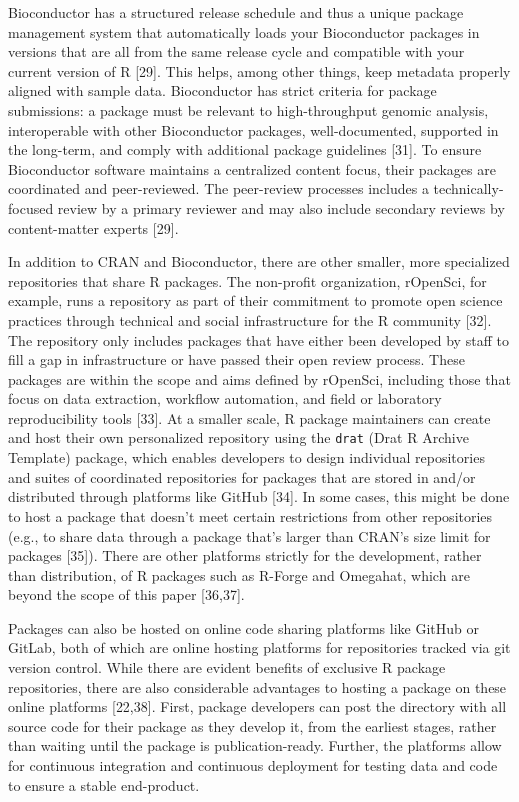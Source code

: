 \documentclass[10pt,letterpaper]{article}
\begin{document}
Bioconductor has a structured release schedule and thus a unique package
management system that automatically loads your Bioconductor packages in
versions that are all from the same release cycle and compatible with
your current version of R {[}29{]}. This helps, among other things, keep
metadata properly aligned with sample data. Bioconductor has strict
criteria for package submissions: a package must be relevant to
high-throughput genomic analysis, interoperable with other Bioconductor
packages, well-documented, supported in the long-term, and comply with
additional package guidelines {[}31{]}. To ensure Bioconductor software
maintains a centralized content focus, their packages are coordinated
and peer-reviewed. The peer-review processes includes a
technically-focused review by a primary reviewer and may also include
secondary reviews by content-matter experts {[}29{]}.

In addition to CRAN and Bioconductor, there are other smaller, more
specialized repositories that share R packages. The non-profit
organization, rOpenSci, for example, runs a repository as part of their
commitment to promote open science practices through technical and
social infrastructure for the R community {[}32{]}. The repository only
includes packages that have either been developed by staff to fill a gap
in infrastructure or have passed their open review process. These
packages are within the scope and aims defined by rOpenSci, including
those that focus on data extraction, workflow automation, and field or
laboratory reproducibility tools {[}33{]}. At a smaller scale, R package
maintainers can create and host their own personalized repository using
the \texttt{drat} (Drat R Archive Template) package, which enables
developers to design individual repositories and suites of coordinated
repositories for packages that are stored in and/or distributed through
platforms like GitHub {[}34{]}. In some cases, this might be done to
host a package that doesn't meet certain restrictions from other
repositories (e.g., to share data through a package that's larger than
CRAN's size limit for packages {[}35{]}). There are other platforms
strictly for the development, rather than distribution, of R packages
such as R-Forge and Omegahat, which are beyond the scope of this paper
{[}36,37{]}.

Packages can also be hosted on online code sharing platforms like GitHub
or GitLab, both of which are online hosting platforms for repositories
tracked via git version control. While there are evident benefits of
exclusive R package repositories, there are also considerable advantages
to hosting a package on these online platforms {[}22,38{]}. First,
package developers can post the directory with all source code for their
package as they develop it, from the earliest stages, rather than
waiting until the package is publication-ready. Further, the platforms
allow for continuous integration and continuous deployment for testing
data and code to ensure a stable end-product.
\end{document}
